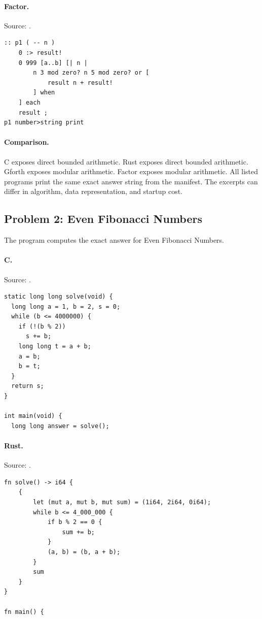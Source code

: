 \paragraph{Factor.} Source: .
\begin{lstlisting}
:: p1 ( -- n )
    0 :> result!
    0 999 [a..b] [| n |
        n 3 mod zero? n 5 mod zero? or [
            result n + result!
        ] when
    ] each
    result ;
p1 number>string print
\end{lstlisting}

\paragraph{Comparison.}
C exposes direct bounded arithmetic. Rust exposes direct bounded arithmetic. Gforth exposes modular arithmetic. Factor exposes modular arithmetic.
All listed programs print the same exact answer string from the manifest. The excerpts can differ in algorithm, data representation, and startup cost.

\subsection{Problem 2: Even Fibonacci Numbers}
\label{walkthrough:p2}
The program computes the exact answer for Even Fibonacci Numbers.

\paragraph{C.} Source: .
\begin{lstlisting}
static long long solve(void) {
  long long a = 1, b = 2, s = 0;
  while (b <= 4000000) {
    if (!(b % 2))
      s += b;
    long long t = a + b;
    a = b;
    b = t;
  }
  return s;
}

int main(void) {
  long long answer = solve();
\end{lstlisting}

\paragraph{Rust.} Source: .
\begin{lstlisting}
fn solve() -> i64 {
    {
        let (mut a, mut b, mut sum) = (1i64, 2i64, 0i64);
        while b <= 4_000_000 {
            if b % 2 == 0 {
                sum += b;
            }
            (a, b) = (b, a + b);
        }
        sum
    }
}

fn main() {
\end{lstlisting}

